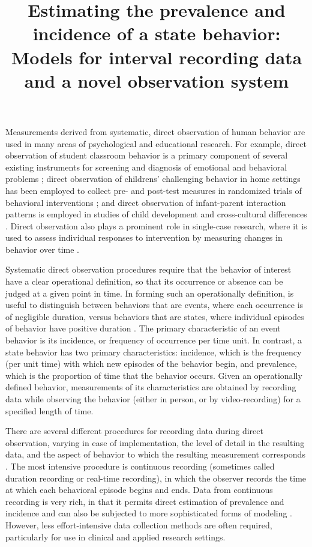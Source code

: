 \documentclass[man, noextraspace, floatsintext]{apa6}\usepackage[]{graphicx}\usepackage[]{color}
\title{Estimating the prevalence and incidence of a state behavior: Models for interval recording data and a novel observation system}
\begin{document}
\maketitle

Measurements derived from systematic, direct observation of human behavior are used in many areas of psychological and educational research. 
For example, direct observation of student classroom behavior is a primary component of several existing instruments for screening and diagnosis of emotional and behavioral problems \citep{Volpe2005observing}; direct observation of childrens' challenging behavior in home settings has been employed to collect pre- and post-test measures in randomized trials of behavioral interventions \citep[e.g.,][]{Durand2012positive}; and direct observation of infant-parent interaction patterns is employed in studies of child development \citep{Mann1991time} and cross-cultural differences \citep{Bornstein2002measurement}. 
Direct observation also plays a prominent role in single-case research, where it is used to assess individual responses to intervention by measuring changes in behavior over time \citep{Kazdin2011single}.

Systematic direct observation procedures require that the behavior of interest have a clear operational definition, so that its occurrence or absence can be judged at a given point in time. 
In forming such an operationally definition, is useful to distinguish between behaviors that are events, where each occurrence is of negligible duration, versus behaviors that are states, where individual episodes of behavior have positive duration \citep{Altmann1974observational}. 
The primary characteristic of an event behavior is its incidence, or frequency of occurrence per time unit. 
In contrast, a state behavior has two primary characteristics: incidence, which is the frequency (per unit time) with which new episodes of the behavior begin, and prevalence, which is the proportion of time that the behavior occurs. 
Given an operationally defined behavior, measurements of its characteristics are obtained by recording data while observing the behavior (either in person, or by video-recording) for a specified length of time. 

There are several different procedures for recording data during direct observation, varying in ease of implementation, the level of detail in the resulting data, and the aspect of behavior to which the resulting measurement corresponds \citep[for surveys of major recording procedures, see][]{Altmann1974observational, Ayres2010dependent, Hartmann1990observational, Primavera1996measurement}. 
The most intensive procedure is continuous recording (sometimes called duration recording or real-time recording), in which the observer records the time at which each behavioral episode begins and ends.
Data from continuous recording is very rich, in that it permits direct estimation of prevalence and incidence and can also be subjected to more sophisticated forms of modeling \citep[e.g.,][]{Bakeman2011sequential, Haccou1992statistical}. 
However, less effort-intensive data collection methods are often required, particularly for use in clinical and applied research settings. 
\end{document}
